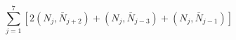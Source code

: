 \begin{equation}
\sum_{j=1}^{7} [ 2(N_j, \bar{N}_{j+2}) + (N_j, \bar{N}_{j-3})
+ (N_j, \bar{N}_{j-1})]
\end{equation}

